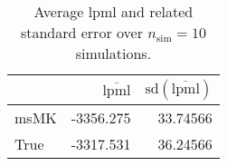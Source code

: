 \begin{table}[H]

\caption{Average lpml and related standard error over $n_{\text{sim}} = 10$ simulations.}
\centering
\begin{tabular}[t]{lrr}
\toprule
  & $\overbar{\text{lpml}}$ & $\text{sd}(\overbar{\text{lpml}})$\\
\midrule
msMK & -3356.275 & 33.74566\\
True & -3317.531 & 36.24566\\
\bottomrule
\end{tabular}
\end{table}